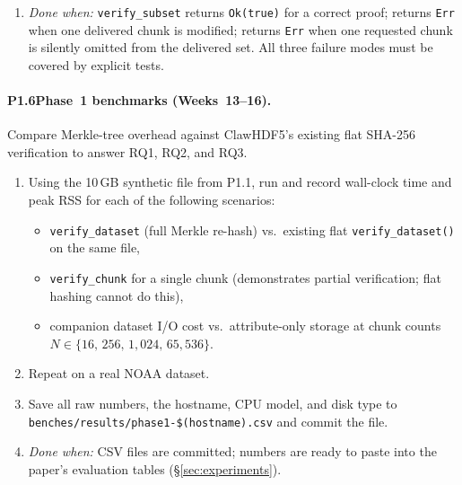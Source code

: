 \documentclass[11pt]{article}
\begin{document}
\begin{enumerate}[nosep]
    dataset with $N = 65{,}536$ chunks:
    \begin{itemize}[nosep]
      \item a contiguous rectangular slab (best case, many shared nodes),
      \item a strided slab (fewer shared nodes),
      \item a random sparse selection of $k$ chunks (near-worst case).
    \end{itemize}
    Record results and compare against the theoretical bound $O(k \log N)$
    (RQ6). Save the table to \texttt{benches/results/subset-proof-size.csv}.
  \item \emph{Done when:} \texttt{verify\_subset} returns \texttt{Ok(true)}
    for a correct proof; returns \texttt{Err} when one delivered chunk is
    modified; returns \texttt{Err} when one requested chunk is silently
    omitted from the delivered set. All three failure modes must be covered
    by explicit tests.
\end{enumerate}

\paragraph{P1.6\enspace Phase~1 benchmarks (Weeks~13--16).}
Compare Merkle-tree overhead against ClawHDF5's existing flat SHA-256
verification to answer RQ1, RQ2, and RQ3.

\begin{enumerate}[nosep]
  \item Using the 10\,GB synthetic file from P1.1, run and record wall-clock
    time and peak RSS for each of the following scenarios:
    \begin{itemize}[nosep]
      \item \texttt{verify\_dataset} (full Merkle re-hash) vs.\ existing
        flat \texttt{verify\_dataset()} on the same file,
      \item \texttt{verify\_chunk} for a single chunk (demonstrates partial
        verification; flat hashing cannot do this),
      \item companion dataset I/O cost vs.\ attribute-only storage at chunk
        counts $N \in \{16,\,256,\,1{,}024,\,65{,}536\}$.
    \end{itemize}
  \item Repeat on a real NOAA dataset.
  \item Save all raw numbers, the hostname, CPU model, and disk type to
    \texttt{benches/results/phase1-\$(hostname).csv} and commit the file.
  \item \emph{Done when:} CSV files are committed; numbers are ready to
    paste into the paper's evaluation tables (\S\ref{sec:experiments}).
\end{enumerate}
\end{document}
